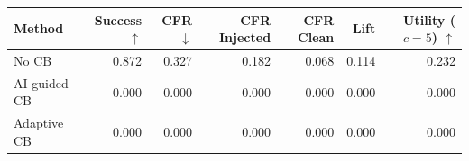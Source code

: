 \begin{tabular}{lrrrrrr}
\toprule
Method & Success $\uparrow$ & CFR $\downarrow$ & CFR Injected & CFR Clean & Lift & Utility ($c=5$) $\uparrow$ \\
\midrule
No CB & 0.872 & 0.327 & 0.182 & 0.068 & 0.114 & 0.232 \\
AI-guided CB & 0.000 & 0.000 & 0.000 & 0.000 & 0.000 & 0.000 \\
Adaptive CB & 0.000 & 0.000 & 0.000 & 0.000 & 0.000 & 0.000 \\
\bottomrule
\end{tabular}
